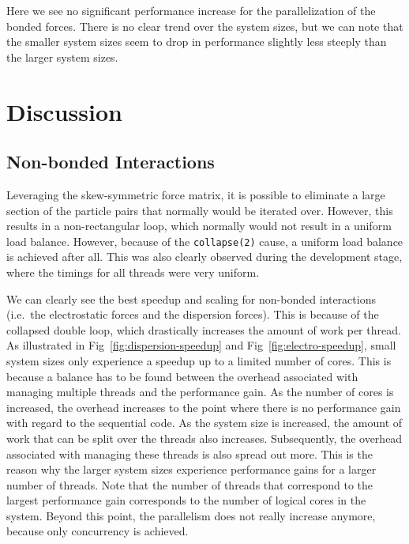 \documentclass[conference]{IEEEtran}
\begin{document}
        Here we see no significant performance increase for the parallelization of the bonded forces. There is no
        clear trend over the system sizes, but we can note that the smaller system sizes seem to drop in performance
        slightly less steeply than the larger system sizes.


\section{Discussion}\label{discussion}
\subsection{Non-bonded Interactions}

Leveraging the skew-symmetric
force matrix, it is possible to eliminate a large section of the particle pairs that normally would be iterated
over. However, this results in a non-rectangular loop, which normally would not result in a uniform load balance.
However, because of the \verb|collapse(2)| cause, a uniform load balance is achieved after all. This was also
clearly observed during the development stage, where the timings for all threads were very uniform.

We can clearly see the best speedup and scaling for non-bonded interactions (i.e.\ the electrostatic forces and 
the dispersion forces). This is because of the collapsed double loop, which drastically increases the amount of
work per thread. As illustrated in Fig~\ref{fig:dispersion-speedup} and Fig~\ref{fig:electro-speedup}, small system
sizes only experience a speedup up to a limited number of cores. This is because a balance has to be found between
the overhead associated with managing multiple threads and the performance gain. As the number of cores is increased,
the overhead increases to the point where there is no performance gain with regard to the sequential code. As the
system size is increased, the amount of work that can be split over the threads also increases. Subsequently, the
overhead associated with managing these threads is also spread out more. This is the reason why the larger system
sizes experience performance gains for a larger number of threads. Note that the number of threads that correspond
to the largest performance gain corresponds to the number of logical cores in the system. Beyond this point, the
parallelism does not really increase anymore, because only concurrency is achieved.
\end{document}

